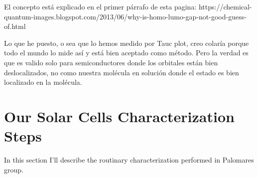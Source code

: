 El concepto está explicado en el primer párrafo de esta pagina:
https://chemical-quantum-images.blogspot.com/2013/06/why-is-homo-lumo-gap-not-good-guess-of.html

Lo que he puesto, o sea que lo hemos medido por Tauc plot, creo colaría
porque todo el mundo lo mide así y está bien aceptado como método. Pero
la verdad es que es valido solo para semiconductores donde los orbitales
están bien deslocalizados, no como nuestra molécula en solución donde el
estado es bien localizado en la molécula.

\section{Our Solar Cells Characterization Steps}

In this section I'll describe the routinary characterization performed in Palomares group.


